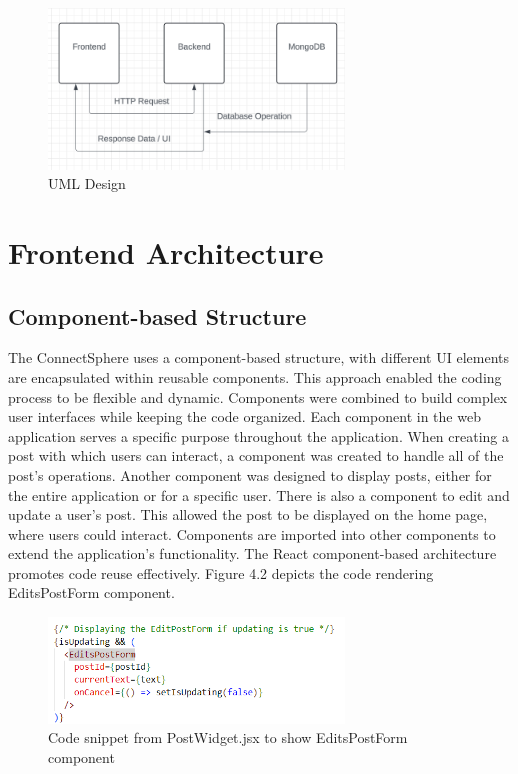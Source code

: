 \begin{figure}[h!]
    \centering
    \includegraphics[width=0.7\textwidth]{images/uml.PNG}
    \caption{UML Design}
    \label{fig:uml-design}
\end{figure}



\section{Frontend Architecture}
\subsection{Component-based Structure}
The ConnectSphere uses a component-based structure, with different UI elements are encapsulated within reusable components. This approach enabled the coding process to be flexible and dynamic. Components were combined to build complex user interfaces while keeping the code organized. Each component in the web application serves a specific purpose throughout the application. When creating a post with which users can interact, a component was created to handle all of the post's operations. Another component was designed to display posts, either for the entire application or for a specific user. There is also a component to edit and update a user's post. This allowed the post to be displayed on the home page, where users could interact. Components are imported into other components to extend the application's functionality. The React component-based architecture promotes code reuse effectively. Figure 4.2 depicts the code rendering EditsPostForm component.

\begin{figure}[h!]
    \centering
    \includegraphics[width=0.7\textwidth]{images/component.PNG}
    \caption{Code snippet from PostWidget.jsx to show EditsPostForm component}
    \label{fig:reusable-component}
\end{figure}

